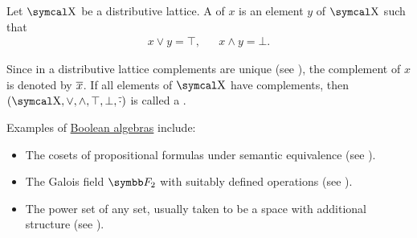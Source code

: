 \begin{Definition}\label{def:boolean_algebra}\cite{nLab:boolean_algebra}
  Let \( \CX \) be a distributive lattice. A  of \( x \) is an element \( y \) of \( \CX \) such that
  \begin{align*}
    x \vee y = \top, && x \wedge y = \bot.
  \end{align*}

  Since in a distributive lattice complements are unique (see ), the complement of \( x \) is denoted by \( \overline{x} \). If all elements of \( \CX \) have complements, then \( (\CX, \vee, \wedge, \top, \bot, \Ol \cdot) \) is called a .
\end{Definition}

\begin{Example}\label{ex:boolean_algebras}
  Examples of \hyperref[def:boolean_algebra]{Boolean algebras} include:

  \begin{itemize}
    \item The cosets of propositional formulas under semantic equivalence (see ).
    \item The Galois field \( \BF_2 \) with suitably defined operations (see ).
    \item The power set of any set, usually taken to be a space with additional structure (see ).
  \end{itemize}
\end{Example}

